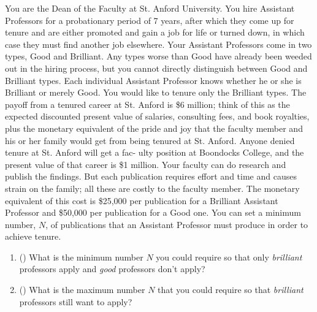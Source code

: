 \begin{question}[type=exam]{8}

  You are the Dean of the Faculty at St. Anford University. You hire Assistant Professors for a probationary period of 7 years, after which they come up for tenure and are either promoted and gain a job for life or turned down, in which case they must find another job elsewhere.
Your Assistant Professors come in two types, Good and Brilliant. Any types worse than Good have already been weeded out in the hiring process, but you cannot directly distinguish between Good and Brilliant types. Each individual Assistant Professor knows whether he or she is Brilliant or merely Good. You would like to tenure only the Brilliant types.
The payoff from a tenured career at St. Anford is \$6 million; think of this as the expected discounted present value of salaries, consulting fees, and book royalties, plus the monetary equivalent of the pride and joy that the faculty member and his or her family would get from being tenured at St. Anford. Anyone denied tenure at St. Anford will get a fac- ulty position at Boondocks College, and the present value of that career is \$1 million.
Your faculty can do research and publish the findings. But each publication requires effort and time and causes strain on the family; all these are costly to the faculty member. The monetary equivalent of this cost is \$25,000 per publication for a Brilliant Assistant Professor and \$50,000 per publication for a Good one. You can set a minimum number, $N$, of publications that an Assistant Professor must produce in order to achieve tenure.

  \begin{enumerate}[label=\Alph*)]
    
    \item ()
    What is the minimum number $N$ you could require so that only \textit{brilliant} professors apply and \textit{good} professors don't apply?

    \vspace{4cm}

    \item () 
    What is the maximum number $N$ that you could require so that \textit{brilliant} professors still want to apply?
    
    \vspace{4cm}

  \end{enumerate}

\end{question}
